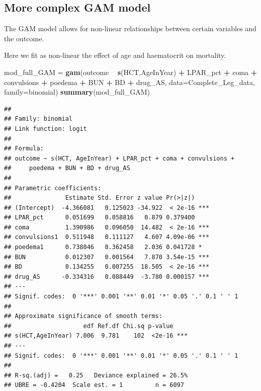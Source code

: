 \documentclass[]{article}
\newenvironment{Shaded}{\begin{snugshade}}{\end{snugshade}}
\newcommand{\KeywordTok}[1]{\textcolor[rgb]{0.13,0.29,0.53}{\textbf{#1}}}
\newcommand{\DataTypeTok}[1]{\textcolor[rgb]{0.13,0.29,0.53}{#1}}
\newcommand{\StringTok}[1]{\textcolor[rgb]{0.31,0.60,0.02}{#1}}
\newcommand{\OperatorTok}[1]{\textcolor[rgb]{0.81,0.36,0.00}{\textbf{#1}}}
\newcommand{\NormalTok}[1]{#1}
\begin{document}
\subsection{More complex GAM model}\label{more-complex-gam-model}

The GAM model allows for non-linear relationships between certain
variables and the outcome.

Here we fit as non-linear the effect of age and haematocrit on
mortality.

\begin{Shaded}
\begin{Highlighting}[]
\NormalTok{mod_full_GAM =}\StringTok{ }\KeywordTok{gam}\NormalTok{(outcome }\OperatorTok{~}\StringTok{ }\KeywordTok{s}\NormalTok{(HCT,AgeInYear) }\OperatorTok{+}\StringTok{ }\NormalTok{LPAR_pct  }\OperatorTok{+}\StringTok{ }\NormalTok{coma }\OperatorTok{+}\StringTok{ }\NormalTok{convulsions }\OperatorTok{+}
\StringTok{                   }\NormalTok{poedema }\OperatorTok{+}\StringTok{ }\NormalTok{BUN }\OperatorTok{+}\StringTok{ }\NormalTok{BD }\OperatorTok{+}\StringTok{ }\NormalTok{drug_AS,}
               \DataTypeTok{data=}\NormalTok{Complete_Leg_data, }\DataTypeTok{family=}\NormalTok{binomial)}
\KeywordTok{summary}\NormalTok{(mod_full_GAM)}
\end{Highlighting}
\end{Shaded}

\begin{verbatim}
## 
## Family: binomial 
## Link function: logit 
## 
## Formula:
## outcome ~ s(HCT, AgeInYear) + LPAR_pct + coma + convulsions + 
##     poedema + BUN + BD + drug_AS
## 
## Parametric coefficients:
##               Estimate Std. Error z value Pr(>|z|)    
## (Intercept)  -4.366081   0.125023 -34.922  < 2e-16 ***
## LPAR_pct      0.051699   0.058816   0.879 0.379400    
## coma          1.390986   0.096050  14.482  < 2e-16 ***
## convulsions1  0.511948   0.111127   4.607 4.09e-06 ***
## poedema1      0.738046   0.362458   2.036 0.041728 *  
## BUN           0.012307   0.001564   7.870 3.54e-15 ***
## BD            0.134255   0.007255  18.505  < 2e-16 ***
## drug_AS      -0.334316   0.088449  -3.780 0.000157 ***
## ---
## Signif. codes:  0 '***' 0.001 '**' 0.01 '*' 0.05 '.' 0.1 ' ' 1
## 
## Approximate significance of smooth terms:
##                    edf Ref.df Chi.sq p-value    
## s(HCT,AgeInYear) 7.006  9.781    102  <2e-16 ***
## ---
## Signif. codes:  0 '***' 0.001 '**' 0.01 '*' 0.05 '.' 0.1 ' ' 1
## 
## R-sq.(adj) =   0.25   Deviance explained = 26.5%
## UBRE = -0.4204  Scale est. = 1         n = 6097
\end{verbatim}
\end{document}
